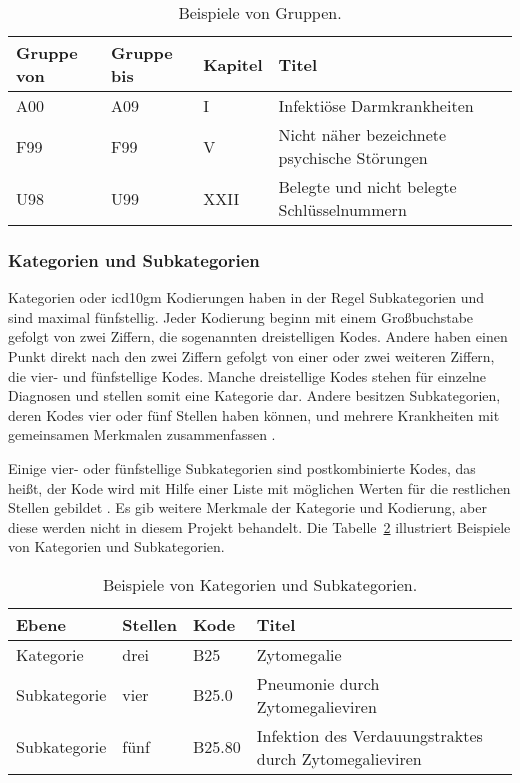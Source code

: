 
\begin{table}[ht]
	\centering
	\small
	\caption{Beispiele von Gruppen.}
	\label{tab:group}
	\begin{tabular}{|l|l|l|p{8cm}|}
		\hline
		\rowcolor{lightgray} Gruppe von & Gruppe bis & Kapitel & Titel \\
		\hline 
		\textsf{A00} &  \textsf{A09} & I & Infektiöse Darmkrankheiten \\ \hline
		\textsf{F99} &  \textsf{F99} & V & Nicht näher bezeichnete psychische Störungen \\ \hline
		\textsf{U98} &  \textsf{U99} & XXII & Belegte und nicht belegte Schlüsselnummern \\ \hline
	\end{tabular}
\end{table}

\subsubsection{Kategorien und Subkategorien} \label{subsubsec:categorysubcat}

Kategorien oder \ac{icd10gm} Kodierungen haben in der Regel Subkategorien und sind maximal fünfstellig. Jeder Kodierung beginn mit einem Großbuchstabe gefolgt von zwei Ziffern, die sogenannten dreistelligen Kodes. Andere haben einen Punkt direkt nach den zwei Ziffern gefolgt von einer oder zwei weiteren Ziffern, die vier- und fünfstellige Kodes. Manche dreistellige Kodes stehen für einzelne Diagnosen und stellen somit eine Kategorie dar. Andere besitzen Subkategorien, deren Kodes vier oder fünf Stellen haben können, und  mehrere Krankheiten mit gemeinsamen Merkmalen zusammenfassen \cite{icd10systauf, icd10kateg}. 

Einige vier- oder fünfstellige Subkategorien sind postkombinierte Kodes, das heißt, der Kode wird mit Hilfe einer Liste mit möglichen Werten für die restlichen Stellen gebildet \cite{icd10kateg}. Es gib weitere Merkmale der Kategorie und Kodierung, aber diese werden nicht in diesem Projekt behandelt. Die Tabelle~\ref{tab:catsubcat} illustriert Beispiele von Kategorien und Subkategorien.


\begin{table}[ht]
	\centering
	\small
	\caption{Beispiele von Kategorien und Subkategorien.}
	\label{tab:catsubcat}
	\begin{tabular}{|l|l|l|p{8cm}|}
		\hline
		\rowcolor{lightgray} Ebene & Stellen & Kode & Titel \\
		\hline 
		Kategorie &  drei & \textsf{B25} & Zytomegalie \\ \hline
		Subkategorie &  vier & \textsf{B25.0} & Pneumonie durch Zytomegalieviren \\ \hline
		Subkategorie &  fünf & \textsf{B25.80} & Infektion des Verdauungstraktes durch Zytomegalieviren \\ \hline
	\end{tabular}
\end{table}

